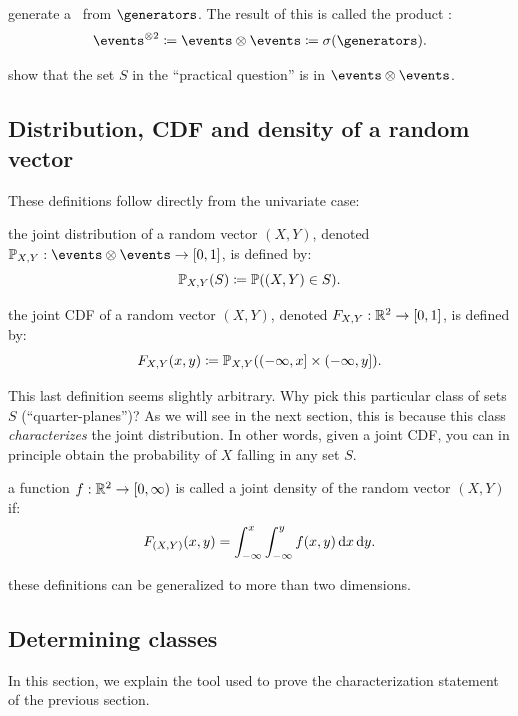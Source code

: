 \documentclass{article}
\begin{document}
 generate a \sigmaalg\ from $\generators$. The result of this is called the product \sigmaalg:
\[ \events^{\otimes 2} \defeq \events \otimes \events \defeq \sigma(\generators). \]

 show that the set $S$ in the ``practical question'' is in $\events \otimes \events$.


\subsection{Distribution, CDF and density of a random vector}

These definitions follow directly from the univariate case:

 the joint distribution of a random vector $(X, Y)$, denoted $\P_{X,Y} : \events \otimes \events \to [0, 1]$, is defined by:
\[ {\mathbb P}_{X,Y}(S) \coloneqq {\mathbb P}((X, Y) \in S). \]

 the joint CDF of a random vector $(X, Y)$, denoted $F_{X,Y} : {\mathbb R}^2 \to [0, 1]$, is defined by:
\[ F_{X, Y}(x, y) \coloneqq {\mathbb P}_{X,Y}((-\infty, x] \times (-\infty, y]). \]

 This last definition seems slightly arbitrary. Why pick this particular class of sets $S$ (``quarter-planes'')? As we will see in the next section, this is because this class \emph{characterizes} the joint distribution. In other words, given a joint CDF, you can in principle obtain the probability of $X$ falling in any set $S$. 

 a function $f:{\mathbb R}^2 \to [0, \infty)$ is called a joint density of the random vector $(X,Y)$ if:
\[ F_{(X,Y)}(x,y) = \int_{-\infty}^x \int_{-\infty}^y f(x,y) \,\mathrm{d} x \,\mathrm{d} y. \]

 these definitions can be generalized to more than two dimensions.


\subsection{Determining classes}

In this section, we explain the tool used to prove the characterization statement of the previous section.
\end{document}

